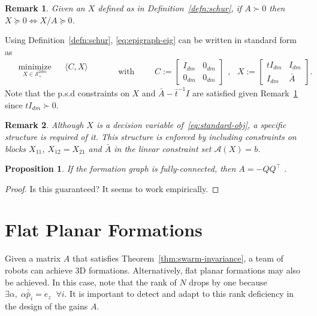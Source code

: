 \documentclass[a4paper]{article}
\newtheorem{prop}{Proposition}
\newtheorem{rem}{Remark}
\begin{document}
\begin{rem}\label{rem:schur-psd}
Given an $X$ defined as in Definition~\ref{defn:schur}, if $A\succ0$ then $X\succeq0\iff X/A\succeq0$.
\end{rem}

Using Definition~\ref{defn:schur}, \eqref{eq:epigraph-eig} can be written in standard form as
\begin{equation}\label{eq:standard-obj}
\begin{split}
\begin{aligned}
& \underset{X\in\mathcal{S}^{2dm}_+}{\mathrm{minimize}}
& & \langle C,X \rangle & \\
\end{aligned}
\end{split}
\qquad\text{with}\qquad
\begin{split}
C:=\begin{bmatrix}I_{dm}&0_{dm}\\0_{dm}&0_{dm}\end{bmatrix}
\end{split}
,\;
\begin{split}
X:=\begin{bmatrix}tI_{dm}&I_{dm}\\I_{dm}&\bar{A}\end{bmatrix}.
\end{split}
\end{equation}
Note that the p.s.d constraints on $X$ and $\bar{A}-\bar{t}^{-1}I$ are satisfied given Remark~\ref{rem:schur-psd} since $tI_{dm}\succ0$.

\begin{rem}
Although $X$ is a decision variable of~\eqref{eq:standard-obj}, a specific structure is required of it.
This structure is enforced by including constraints on blocks $X_{11}$, $X_{12}=X_{21}$ and $\bar{A}$ in the linear constraint set $\mathcal{A}(X)=b$.
\end{rem}

\begin{prop}
If the formation graph is fully-connected, then $A = -Q Q^\top$ .
\end{prop}
\begin{proof}
Is this guaranteed? It seems to work empirically.
\end{proof}

\section*{Flat Planar Formations}
Given a matrix $A$ that satisfies Theorem~\ref{thm:swarm-invariance}, a team of robots can achieve 3D formations.
Alternatively, flat planar formations may also be achieved.
In this case, note that the rank of $N$ drops by one because $\exists\alpha,\;\alpha\bar{\bar{p}}_i = e_z\;\;\forall i$.
It is important to detect and adapt to this rank deficiency in the design of the gains $A$.



\end{document}
